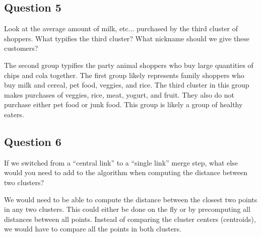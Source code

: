 \documentclass{math}
\begin{document}
\subsection*{Question 5}
Look at the average amount of milk, etc... purchased by the third cluster of
shoppers. What typifies the third cluster? What nickname should we give these
customers? \par
\begin{center}
\end{center}
The second group typifies the party animal shoppers who buy large quantities
of chips and cola together. The first group likely represents family shoppers
who buy milk and cereal, pet food, veggies, and rice. The third cluster in this
group makes purchases of veggies, rice, meat, yogurt, and fruit. They also do
not purchase either pet food or junk food. This group is likely a group of
healthy eaters.

\subsection*{Question 6}
If we switched from a ``central link'' to a ``single link'' merge step, what
else would you need to add to the algorithm when computing the distance between
two clusters? \par
We would need to be able to compute the distance between the closest two points
in any two clusters. This could either be done on the fly or by precomputing
all distances between all points. Instead of comparing the cluster centers
(centroids), we would have to compare all the points in both clusters.
\end{document}
